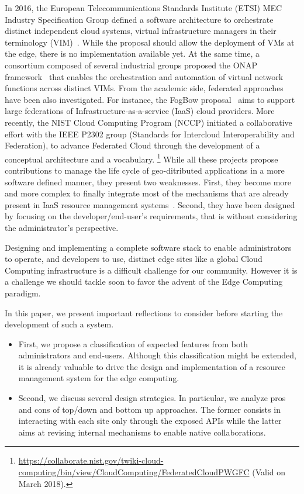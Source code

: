 In 2016, the European Telecommunications Standards Institute (ETSI) MEC
Industry Specification Group defined  a software architecture
to orchestrate distinct independent cloud systems, \aka virtual
infrastructure managers in their terminology
(VIM)~\cite{7574435}. While the proposal should allow the deployment
of VMs at the edge, there is no implementation available yet.  At the
same time, a consortium composed of several industrial groups proposed
the ONAP framework~\cite{onap} that enables the orchestration and
automation of virtual network functions across distinct VIMs.  From
the academic side, federated approaches have been also investigated.
For instance, the FogBow proposal~\cite{brasileiro2016fogbow} aims to
support large federations of Infrastructure-as-a-service (IaaS) cloud
providers. More recently, the NIST Cloud Computing Program (NCCP)
initiated a collaborative effort with the IEEE P2302 group (Standards for Intercloud Interoperability and
Federation), to advance Federated Cloud through the development
of a conceptual architecture and a vocabulary.
\footnote{\url{https://collaborate.nist.gov/twiki-cloud-computing/bin/view/CloudComputing/FederatedCloudPWGFC} (Valid on March 2018).}
%
While all these projects propose contributions to manage the life cycle of
geo-ditributed applications in a more software defined manner, they present two
weaknesses. First, they become more and more complex to finally
integrate most of the mechanisms that are already present in
IaaS resource management systems~\cite{}.  Second,
they have been designed by focusing on the developer/end-user's
requirements, that is without considering the administrator's
perspective.

Designing and implementing a complete software stack to enable
administrators to operate, and developers to use, distinct edge sites
like a global Cloud Computing infrastructure is a difficult challenge
for our community. However it is a challenge we should tackle soon to
favor the advent of the Edge Computing paradigm.

In this paper, we
present important reflections to consider before starting the development of such a system.
\begin{itemize}
\item First, we propose a classification of expected features from
  both administrators and end-users. Although this classification might be extended, it is already valuable to drive the design and implementation of a resource management system for the edge computing.
    \item Second, we discuss several design strategies. In particular, we
  analyze pros and cons of top/down and bottom up approaches. The
  former consists in interacting with each site only through the exposed APIs
  while the latter aims at revising internal mechanisms to enable
  native collaborations.
  \end{itemize}

